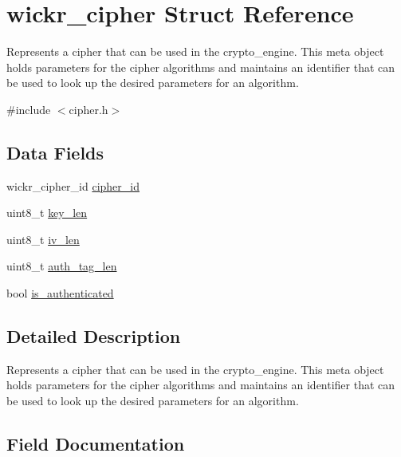\hypertarget{structwickr__cipher}{}\section{wickr\+\_\+cipher Struct Reference}
\label{structwickr__cipher}


Represents a cipher that can be used in the crypto\+\_\+engine. This meta object holds parameters for the cipher algorithms and maintains an identifier that can be used to look up the desired parameters for an algorithm.  




{\ttfamily \#include $<$cipher.\+h$>$}

\subsection*{Data Fields}
\begin{DoxyCompactItemize}
\item 
wickr\+\_\+cipher\+\_\+id \hyperlink{structwickr__cipher_a2ce240f5bd396df05ddd4f30ba944b36}{cipher\+\_\+id}
\item 
uint8\+\_\+t \hyperlink{structwickr__cipher_aec5724cc59d20ae5d7cbb73684b53457}{key\+\_\+len}
\item 
uint8\+\_\+t \hyperlink{structwickr__cipher_a1cd39366934a31345d63ff42deeac1e3}{iv\+\_\+len}
\item 
uint8\+\_\+t \hyperlink{structwickr__cipher_a5ec0af7f260a3f14e31ce8db899aa06e}{auth\+\_\+tag\+\_\+len}
\item 
bool \hyperlink{structwickr__cipher_a21499cb78c9db301261c9d0d647b3e50}{is\+\_\+authenticated}
\end{DoxyCompactItemize}


\subsection{Detailed Description}
Represents a cipher that can be used in the crypto\+\_\+engine. This meta object holds parameters for the cipher algorithms and maintains an identifier that can be used to look up the desired parameters for an algorithm. 

\subsection{Field Documentation}
\mbox{\label{structwickr__cipher_a5ec0af7f260a3f14e31ce8db899aa06e}} 

